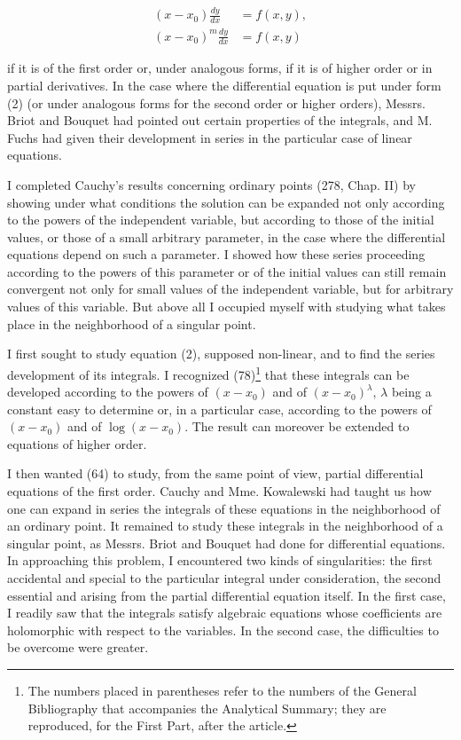 \documentclass[11pt]{article}
\begin{document}
\begin{align}
(x-x_0)\frac{dy}{dx}&=f(x,y),\\
(x-x_0)^m\frac{dy}{dx}&=f(x,y)
\end{align}

if it is of the first order or, under analogous forms, if it is of higher order or in partial derivatives. In the case where the differential equation is put under form (2) (or under analogous forms for the second order or higher orders), Messrs. Briot and Bouquet had pointed out certain properties of the integrals, and M. Fuchs had given their development in series in the particular case of linear equations.

I completed Cauchy’s results concerning ordinary points (278, Chap. II) by showing under what conditions the solution can be expanded not only according to the powers of the independent variable, but according to those of the initial values, or those of a small arbitrary parameter, in the case where the differential equations depend on such a parameter. I showed how these series proceeding according to the powers of this parameter or of the initial values can still remain convergent not only for small values of the independent variable, but for arbitrary values of this variable. But above all I occupied myself with studying what takes place in the neighborhood of a singular point.

I first sought to study equation (2), supposed non-linear, and to find the series development of its integrals. I recognized (78)\footnote{The numbers placed in parentheses refer to the numbers of the General Bibliography that accompanies the Analytical Summary; they are reproduced, for the First Part, after the article.} that these integrals can be developed according to the powers of $(x-x_0)$ and of $(x-x_0)^\lambda$, $\lambda$ being a constant easy to determine or, in a particular case, according to the powers of $(x-x_0)$ and of $\log(x-x_0)$. The result can moreover be extended to equations of higher order.

I then wanted (64) to study, from the same point of view, partial differential equations of the first order. Cauchy and Mme. Kowalewski had taught us how one can expand in series the integrals of these equations in the neighborhood of an ordinary point. It remained to study these integrals in the neighborhood of a singular point, as Messrs. Briot and Bouquet had done for differential equations. In approaching this problem, I encountered two kinds of singularities: the first accidental and special to the particular integral under consideration, the second essential and arising from the partial differential equation itself. In the first case, I readily saw that the integrals satisfy algebraic equations whose coefficients are holomorphic with respect to the variables. In the second case, the difficulties to be overcome were greater.
\end{document}
